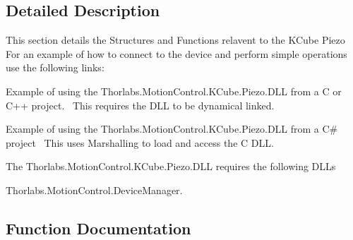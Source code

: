 

\subsection{Detailed Description}
This section details the Structures and Functions relavent to the K\+Cube Piezo~\newline
 For an example of how to connect to the device and perform simple operations use the following links\+: 
\begin{DoxyItemize}
\item Example of using the Thorlabs.Motion\+Control.K\+Cube.Piezo.D\+LL from a C or C++ project.~\newline
 This requires the D\+LL to be dynamical linked.  
\item Example of using the Thorlabs.Motion\+Control.K\+Cube.Piezo.D\+LL from a C\# project~\newline
 This uses Marshalling to load and access the C D\+LL.  
\end{DoxyItemize}The Thorlabs.\+Motion\+Control.\+K\+Cube.\+Piezo.\+D\+LL requires the following D\+L\+Ls 
\begin{DoxyItemize}
\item Thorlabs.\+Motion\+Control.\+Device\+Manager.  
\end{DoxyItemize}

\subsection{Function Documentation}
